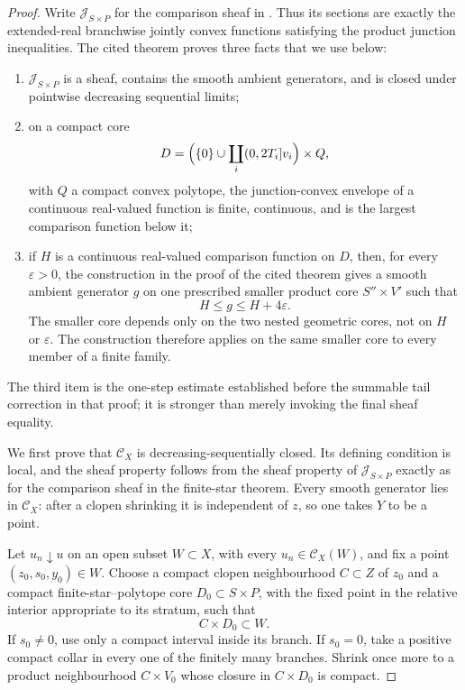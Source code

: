\begin{proof}
Write \(\mathcal J_{S\times P}\) for the comparison sheaf in
.  Thus its sections are
exactly the extended-real branchwise jointly convex functions satisfying
the product junction inequalities.  The cited theorem proves three facts
that we use below:
\begin{enumerate}
\item \(\mathcal J_{S\times P}\) is a sheaf, contains the smooth ambient
  generators, and is closed under pointwise decreasing sequential limits;
\item on a compact core
  \[
   D=\Bigl(\{0\}\cup\coprod_i(0,2T_i]v_i\Bigr)\times Q,
  \]
  with \(Q\) a compact convex polytope, the junction-convex envelope of a
  continuous real-valued function is finite, continuous, and is the largest
  comparison function below it;
\item if \(H\) is a continuous real-valued comparison function on \(D\),
  then, for every \(\varepsilon>0\), the construction in the proof of the
  cited theorem gives a smooth ambient generator \(g\) on one prescribed
  smaller product core \(S''\times V'\) such that
  \begin{equation}
                         H\leq g\leq H+4\varepsilon.
   \label{eq:p071-stone-star-one-step-smoothing}
  \end{equation}
  The smaller core depends only on the two nested geometric cores, not on
  \(H\) or \(\varepsilon\).  The construction therefore applies on the
  same smaller core to every member of a finite family.
\end{enumerate}
The third item is the one-step estimate established before the summable
tail correction in that proof; it is stronger than merely invoking the
final sheaf equality.

We first prove that \(\mathcal C_X\) is decreasing-sequentially closed.
Its defining condition is local, and the sheaf property follows from the
sheaf property of \(\mathcal J_{S\times P}\) exactly as for the comparison
sheaf in the finite-star theorem.  Every smooth generator lies in
\(\mathcal C_X\): after a clopen shrinking it is independent of \(z\), so
one takes \(Y\) to be a point.

Let \(u_n\downarrow u\) on an open subset \(W\subset X\), with every
\(u_n\in\mathcal C_X(W)\), and fix a point \((z_0,s_0,y_0)\in W\).
Choose a compact clopen neighbourhood \(C\subset Z\) of \(z_0\) and a
compact finite-star--polytope core \(D_0\subset S\times P\), with the fixed
point in the relative interior appropriate to its stratum, such that
\begin{equation}
                              C\times D_0\subset W.
 \label{eq:p071-stone-star-limit-core}
\end{equation}
If \(s_0\ne0\), use only a compact interval inside its branch.  If
\(s_0=0\), take a positive compact collar in every one of the finitely many
branches.  Shrink once more to a product neighbourhood
\(C\times V_0\) whose closure in \(C\times D_0\) is compact.


\end{proof}
